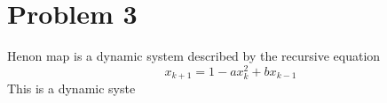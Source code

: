 \section{Problem 3}

Henon map is a dynamic system described by the recursive equation 
\[
x_{k+1} = 1 - ax^2_k + bx_{k-1}
\]
This is a dynamic syste